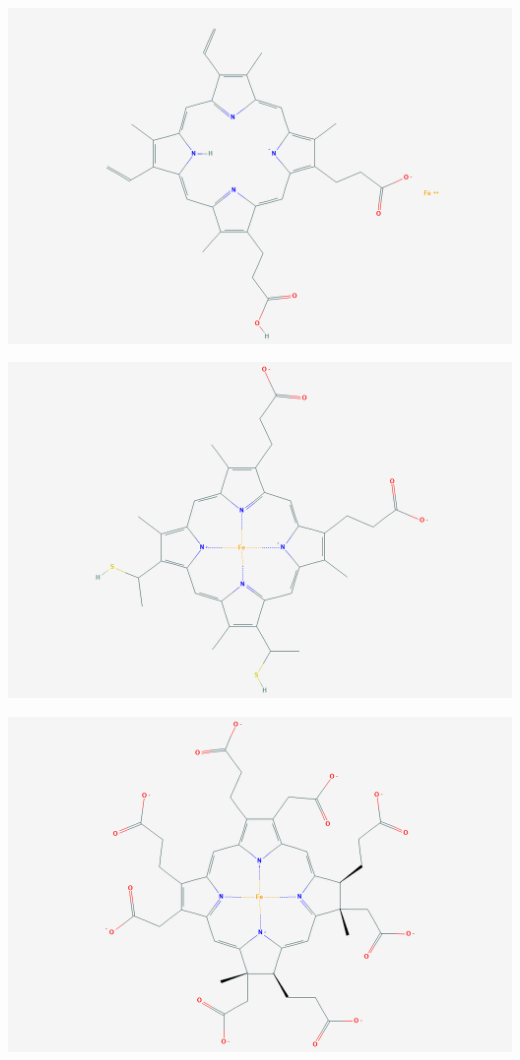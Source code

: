 \documentclass[a4paper, nobind]{templates/ociamthesis}
\let\origfigure\figure
\let\endorigfigure\endfigure
\renewenvironment{figure}[1][2] {
    \expandafter\origfigure\expandafter[H]
} {
    \endorigfigure
}
\begin{document}
\begin{figure}

{\centering \includegraphics[width=0.5\linewidth]{figures/HEM-b} 

}

\caption{Heme-b (HEM)}\label{fig:structHEM}
\end{figure}
\begin{figure}

{\centering \includegraphics[width=0.5\linewidth]{figures/HEM-c} 

}

\caption{Heme-c (HEC)}\label{fig:structHEC}
\end{figure}

\begin{figure}

{\centering \includegraphics[width=0.5\linewidth]{figures/SRM} 

}

\caption{Siroheme (SRM)}\label{fig:structSRM}
\end{figure}
\end{document}

